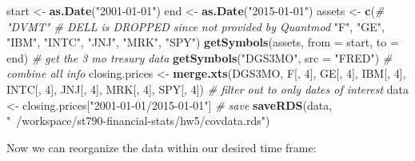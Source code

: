\documentclass[11pt,]{article}
\newenvironment{Shaded}{\begin{snugshade}}{\end{snugshade}}
\newcommand{\CommentTok}[1]{\textcolor[rgb]{0.56,0.35,0.01}{\textit{#1}}}
\newcommand{\DataTypeTok}[1]{\textcolor[rgb]{0.13,0.29,0.53}{#1}}
\newcommand{\DecValTok}[1]{\textcolor[rgb]{0.00,0.00,0.81}{#1}}
\newcommand{\KeywordTok}[1]{\textcolor[rgb]{0.13,0.29,0.53}{\textbf{#1}}}
\newcommand{\NormalTok}[1]{#1}
\newcommand{\StringTok}[1]{\textcolor[rgb]{0.31,0.60,0.02}{#1}}
\begin{document}
\begin{Shaded}
\begin{Highlighting}[]
\NormalTok{start <-}\StringTok{ }\KeywordTok{as.Date}\NormalTok{(}\StringTok{"2001-01-01"}\NormalTok{)}
\NormalTok{end <-}\StringTok{ }\KeywordTok{as.Date}\NormalTok{(}\StringTok{"2015-01-01"}\NormalTok{)}
\NormalTok{assets <-}\StringTok{ }\KeywordTok{c}\NormalTok{(}\CommentTok{# "DVMT" # DELL is DROPPED since not provided by Quantmod}
  \StringTok{"F"}\NormalTok{, }
  \StringTok{"GE"}\NormalTok{, }
  \StringTok{"IBM"}\NormalTok{, }
  \StringTok{"INTC"}\NormalTok{,}
  \StringTok{"JNJ"}\NormalTok{,}
  \StringTok{"MRK"}\NormalTok{,}
  \StringTok{"SPY"}\NormalTok{)}
\KeywordTok{getSymbols}\NormalTok{(assets, }\DataTypeTok{from =}\NormalTok{ start, }\DataTypeTok{to =}\NormalTok{ end) }
\CommentTok{# get the 3 mo tresury data }
\KeywordTok{getSymbols}\NormalTok{(}\StringTok{"DGS3MO"}\NormalTok{, }\DataTypeTok{src =} \StringTok{"FRED"}\NormalTok{)}
\CommentTok{# combine all info}
\NormalTok{closing.prices <-}\StringTok{ }\KeywordTok{merge.xts}\NormalTok{(DGS3MO, }
\NormalTok{                            F[, }\DecValTok{4}\NormalTok{], }
\NormalTok{                            GE[, }\DecValTok{4}\NormalTok{],}
\NormalTok{                            IBM[, }\DecValTok{4}\NormalTok{],}
\NormalTok{                            INTC[, }\DecValTok{4}\NormalTok{],}
\NormalTok{                            JNJ[, }\DecValTok{4}\NormalTok{], }
\NormalTok{                            MRK[, }\DecValTok{4}\NormalTok{], }
\NormalTok{                            SPY[, }\DecValTok{4}\NormalTok{])}
\CommentTok{# filter out to only dates of interest}
\NormalTok{data <-}\StringTok{ }\NormalTok{closing.prices[}\StringTok{"2001-01-01/2015-01-01"}\NormalTok{]}
\CommentTok{# save}
\KeywordTok{saveRDS}\NormalTok{(data, }\StringTok{"~/workspace/st790-financial-stats/hw5/covdata.rds"}\NormalTok{)}
\end{Highlighting}
\end{Shaded}

Now we can reorganize the data within our desired time frame:
\end{document}

